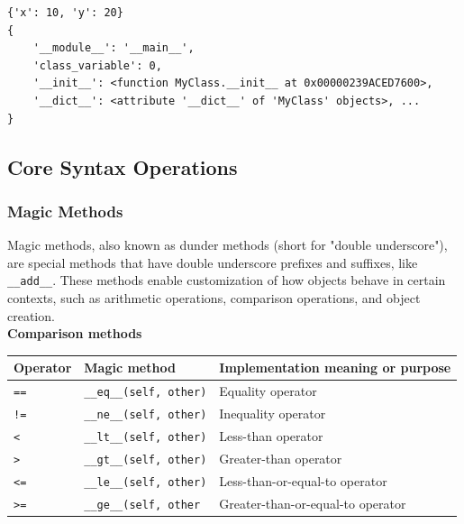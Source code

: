 \begin{verbatim}
{'x': 10, 'y': 20}
{
    '__module__': '__main__', 
    'class_variable': 0, 
    '__init__': <function MyClass.__init__ at 0x00000239ACED7600>, 
    '__dict__': <attribute '__dict__' of 'MyClass' objects>, ...
}
\end{verbatim}

\newpage
\subsection{Core Syntax Operations}

\subsubsection{Magic Methods}
Magic methods, also known as dunder methods (short for "double underscore"), are special methods that have double underscore prefixes and suffixes, like \texttt{\_\_add\_\_}. These methods enable customization of how objects behave in certain contexts, such as arithmetic operations, comparison operations, and object creation.\\

\textbf{Comparison methods}\\[0.1cm]
\begin{tabular}{|p{3cm}|p{4cm}|p{8cm}|}
\hline
\textbf{Operator} & \textbf{Magic method} & \textbf{Implementation meaning or purpose} \\
\hline
\texttt{==} & \texttt{\_\_eq\_\_(self, other)} & Equality operator \\
\texttt{!=} & \texttt{\_\_ne\_\_(self, other)} & Inequality operator \\
\texttt{<} & \texttt{\_\_lt\_\_(self, other)} & Less-than operator \\
\texttt{>} & \texttt{\_\_gt\_\_(self, other)} & Greater-than operator \\
\texttt{<=} & \texttt{\_\_le\_\_(self, other)} & Less-than-or-equal-to operator \\
\texttt{>=} & \texttt{\_\_ge\_\_(self, other} & Greater-than-or-equal-to operator \\
\hline
\end{tabular}

\vspace{0.5cm}

